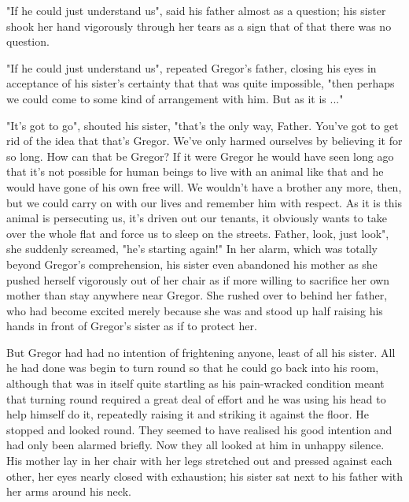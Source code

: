 \documentclass[12pt]{book}
\begin{document}
    "If he could just understand us", said his father almost as a question; his sister shook her hand vigorously through her tears as a sign that of that there was no question.

    "If he could just understand us", repeated Gregor's father, closing his eyes in acceptance of his sister's certainty that that was quite impossible, "then perhaps we could come to some kind of arrangement with him. But as it is ..."

    "It's got to go", shouted his sister, "that's the only way, Father. You've got to get rid of the idea that that's Gregor. We've only harmed ourselves by believing it for so long. How can that be Gregor? If it were Gregor he would have seen long ago that it's not possible for human beings to live with an animal like that and he would have gone of his own free will. We wouldn't have a brother any more, then, but we could carry on with our lives and remember him with respect. As it is this animal is persecuting us, it's driven out our tenants, it obviously wants to take over the whole flat and force us to sleep on the streets. Father, look, just look", she suddenly screamed, "he's starting again!"   In her alarm, which was totally beyond Gregor's comprehension, his sister even abandoned his mother as she pushed herself vigorously out of her chair as if more willing to sacrifice her own mother than stay anywhere near Gregor. She rushed over to behind her father, who had become excited merely because she was and stood up half raising his hands in front of Gregor's sister as if to protect her.

    But Gregor had had no intention of frightening anyone, least of all his sister. All he had done was begin to turn round so that he could go back into his room, although that was in itself quite startling as his pain-wracked condition meant that turning round required a great deal of effort and he was using his head to help himself do it, repeatedly raising it and striking it against the floor. He stopped and looked round. They seemed to have realised his good intention and had only been alarmed briefly. Now they all looked at him in unhappy silence. His mother lay in her chair with her legs stretched out and pressed against each other, her eyes nearly closed with exhaustion; his sister sat next to his father with her arms around his neck.
\end{document}
